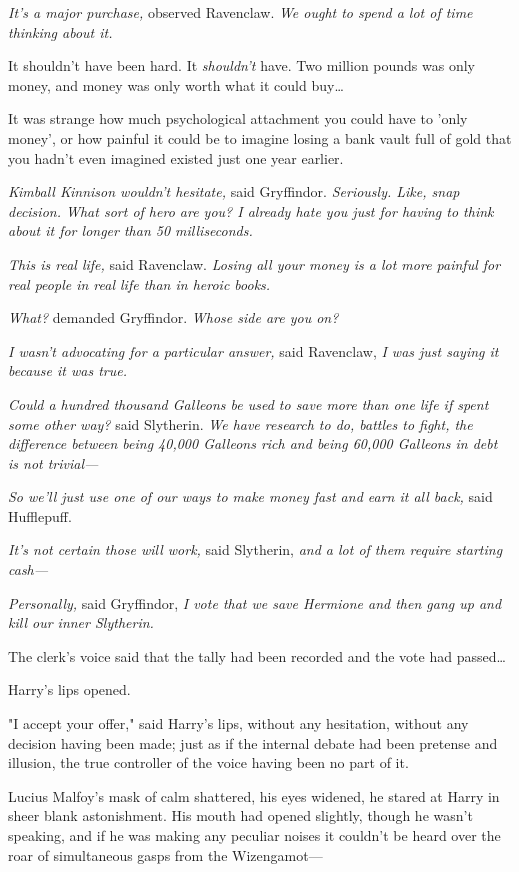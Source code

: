 \emph{It's a major purchase,} observed Ravenclaw. \emph{We ought to spend a lot 
of time thinking about it.}

It shouldn't have been hard. It \emph{shouldn't} have. Two million pounds was 
only money, and money was only worth what it could buy{\ldots}

It was strange how much psychological attachment you could have to 'only 
money', or how painful it could be to imagine losing a bank vault full of gold 
that you hadn't even imagined existed just one year earlier.

\emph{Kimball Kinnison wouldn't hesitate,} said Gryffindor. \emph{Seriously. 
Like, snap decision. What sort of hero are you? I already hate you just for 
having to think about it for longer than 50 milliseconds.}

\emph{This is real life,} said Ravenclaw. \emph{Losing all your money is a lot 
more painful for real people in real life than in heroic books.}

\emph{What?} demanded Gryffindor. \emph{Whose side are you on?}

\emph{I wasn't advocating for a particular answer,} said Ravenclaw, \emph{I was 
just saying it because it was true.}

\emph{Could a hundred thousand Galleons be used to save more than one life if 
spent some other way?} said Slytherin. \emph{We have research to do, battles to 
fight, the difference between being 40,000 Galleons rich and being 60,000 
Galleons in debt is not trivial---}

\emph{So we'll just use one of our ways to make money fast and earn it all 
back,} said Hufflepuff.

\emph{It's not certain those will work,} said Slytherin, \emph{and a lot of 
them require starting cash---}

\emph{Personally,} said Gryffindor,\emph{ I vote that we save Hermione and then 
gang up and kill our inner Slytherin.}

The clerk's voice said that the tally had been recorded and the vote had 
passed{\ldots}

Harry's lips opened.

"I accept your offer," said Harry's lips, without any hesitation, without any 
decision having been made; just as if the internal debate had been pretense and 
illusion, the true controller of the voice having been no part of it.

Lucius Malfoy's mask of calm shattered, his eyes widened, he stared at Harry in 
sheer blank astonishment. His mouth had opened slightly, though he wasn't 
speaking, and if he was making any peculiar noises it couldn't be heard over 
the roar of simultaneous gasps from the Wizengamot---

